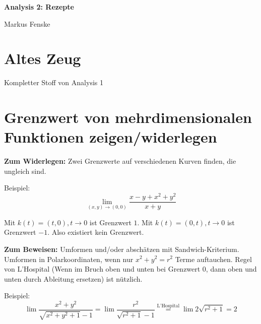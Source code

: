 \documentclass[a4paper,german,10pt,smallheadings]{scrartcl}
\begin{document}
\begin{center}
\bfseries %
\sffamily %
\vspace{-40pt}
Analysis 2: Rezepte

Markus Fenske
\vspace{-10pt}
\end{center}

\section{Altes Zeug}

Kompletter Stoff von Analysis 1

\section{Grenzwert von mehrdimensionalen Funktionen zeigen/widerlegen}

\textbf{Zum Widerlegen:} Zwei Grenzwerte auf verschiedenen Kurven finden, die
ungleich sind.

Beispiel:
\begin{equation*}
  \lim_{(x,y) \to (0,0)} \frac{x-y+x^2+y^2}{x+y}
\end{equation*}

Mit $k(t) = (t,0), t \to 0$ ist Grenzwert $1$. Mit $k(t) = (0,t), t \to 0$ ist
Grenzwert $-1$. Also existiert kein Grenzwert.

\textbf{Zum Beweisen:} Umformen und/oder abschätzen mit Sandwich-Kriterium.
Umformen in Polarkoordinaten, wenn nur $x^2+y^2 = r^2$ Terme auftauchen. Regel
von L'Hospital (Wenn im Bruch oben und unten bei Grenzwert 0, dann oben und
unten durch Ableitung ersetzen) ist nützlich.

Beispiel:
\begin{equation*}
  \lim \frac{x^2+y^2}{\sqrt{x^2+y^2+1}-1} = \lim \frac{r^2}{\sqrt{r^2+1}-1} \overset{\text{L'Hospital}}{=} \lim 2\sqrt{r^2+1} = 2
\end{equation*}
\end{document}
